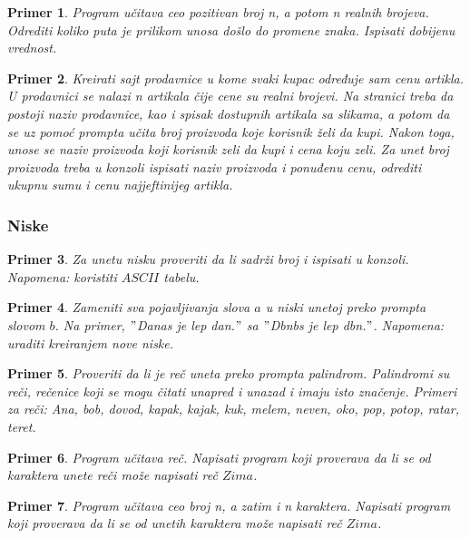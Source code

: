 \documentclass[a4paper]{article}
\newtheorem{primer}{Primer}[section]
\begin{document}
\begin{primer}
Program učitava ceo pozitivan broj n, a potom n realnih
brojeva. Odrediti koliko puta je prilikom unosa došlo do promene znaka. Ispisati
dobijenu vrednost.
\end{primer}

\begin{primer}
Kreirati sajt prodavnice u kome svaki kupac određuje sam cenu artikla. U prodavnici se nalazi n artikala čije cene su realni brojevi. Na stranici treba da postoji naziv prodavnice, kao i spisak dostupnih artikala sa slikama, a potom da se uz pomoć prompta učita broj proizvoda koje korisnik želi da kupi. Nakon toga, unose se naziv proizvoda koji korisnik zeli da kupi i cena koju zeli. Za unet broj proizvoda treba u konzoli ispisati naziv proizvoda i ponuđenu cenu, odrediti ukupnu sumu i cenu najjeftinijeg artikla.
\end{primer}

\subsubsection{Niske}
\begin{primer}
Za unetu nisku proveriti da li sadrži broj i ispisati u konzoli. Napomena: koristiti $ASCII$ tabelu.
\end{primer}

\begin{primer}
Zameniti sva pojavljivanja slova $a$ u niski unetoj preko prompta slovom $b$. Na primer, $"$Danas je lep dan.$"$ sa $"$Dbnbs je lep dbn.$"$. Napomena: uraditi kreiranjem nove niske.
\end{primer}

\begin{primer}
Proveriti da li je reč uneta preko prompta palindrom. Palindromi su reči, rečenice koji se mogu čitati unapred i unazad i imaju isto značenje. Primeri za reči: Ana, bob, dovod, kapak, kajak, kuk, melem, neven, oko, pop, potop, ratar, teret. 
\end{primer}

\begin{primer}
Program učitava reč. Napisati
program koji proverava da li se od karaktera unete reči može napisati reč $Zima$.
\end{primer}

\begin{primer}
Program učitava ceo broj n, a zatim i n karaktera. Napisati
program koji proverava da li se od unetih karaktera može napisati reč $Zima$.
\end{primer}
\end{document}
